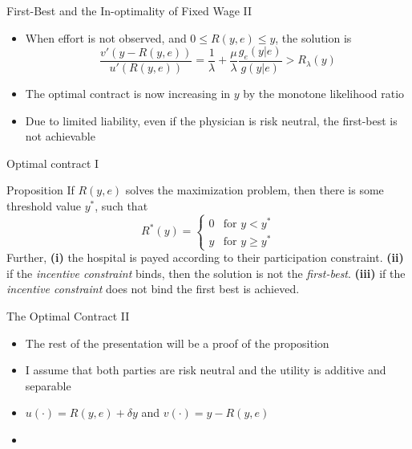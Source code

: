 \documentclass[compress]{beamer}
\begin{document}
\begin{frame}[c]{First-Best and the In-optimality of Fixed Wage II}
  \begin{itemize}[<+- | alert@+>]
    \item When effort is not observed, and $0\leq R(y,e)\leq y$, the solution is
          \[
            \frac{v'(y-R(y,e))}{u'(R(y,e))}=\frac{1}{\lambda}+\frac{\mu}{\lambda}\frac{g_e(y|e)}{g(y|e)}>R_\lambda(y)
          \]
    \item The optimal contract is now increasing in $y$ by the monotone likelihood ratio
    \item Due to limited liability, even if the physician is risk neutral, the first-best is not achievable
  \end{itemize}
\end{frame}

\begin{frame}[c]{Optimal contract I}
  \begin{alertblock}{Proposition}
    \label{prop:payment-function}
    If $R(y,e)$ solves the maximization problem, then there is some threshold value $y^*$, such that 
    \[
      R^*(y)=\begin{cases}
      0 & \text{for } y< y^* \\
      y & \text{for } y\geq y^*
      \end{cases}            
    \]
    Further,  \textbf{(i)} the hospital is payed according to their participation constraint. \textbf{(ii)}  if the \emph{incentive constraint} binds, then the solution is not the \emph{first-best}. \textbf{(iii)}  if the \emph{incentive constraint} does not bind the first best is achieved.
  \end{alertblock}
\end{frame}

\begin{frame}[c]{The Optimal Contract II}
  \begin{itemize}[<+- | alert@+>]
    \item The rest of the presentation will be a proof of the proposition
    \item I assume that both parties are risk neutral and the utility is additive and separable
    \item $u(\cdot)=R(y,e)+\delta y$ and $v(\cdot)=y-R(y,e)$
    \item 
  \end{itemize}
\end{frame}
\end{document}
